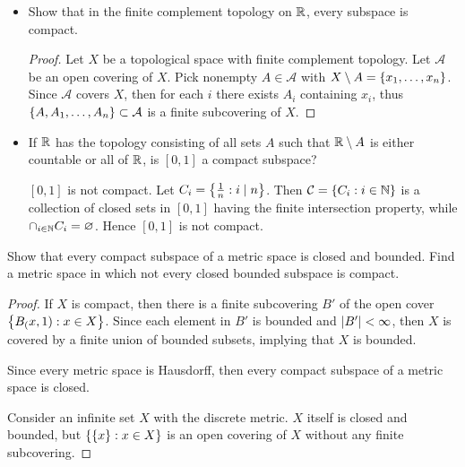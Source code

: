\documentclass[12pt,a4paper]{article}
\begin{document}
    \begin{ex}\hfill

        \begin{itemize}
            \item Show that in the finite complement topology on $\mathbb{R}$, every subspace is compact.
            \begin{proof}
                Let $X$ be a topological space with finite complement topology. Let $\mathcal{A}$ be an open covering of $X$. Pick nonempty $A\in\mathcal{A}$ with $X\setminus A=\left\{x_1,\dots,x_n\right\}$. Since $\mathcal{A}$ covers $X$, then for each $i$ there exists $A_i$ containing $x_i$, thus $\left\{A,A_1,\dots,A_n\right\}\subset\mathcal{A}$ is a finite subcovering of $X$.
            \end{proof}
            \item If $\mathbb{R}$ has the topology consisting of all sets $A$ such that $\mathbb{R}\setminus A$ is either countable or all of $\mathbb{R}$, is $[0,1]$ a compact subspace?
            \begin{sol}
                $[0,1]$ is not compact. Let $C_i=\left\{\frac{1}{n}:i\mid n\right\}$. Then $\mathcal{C}=\left\{C_i:i\in\mathbb{N}\right\}$ is a collection of closed sets in $[0,1]$ having the finite intersection property, while $\cap_{i\in\mathbb{N}} C_i=\varnothing$. Hence $[0,1]$ is not compact.
            \end{sol}
        \end{itemize}
    \end{ex}
    \hfill

    \begin{ex}
        Show that every compact subspace of a metric space is closed and bounded. Find a metric space in which not every closed bounded subspace is compact.
    \end{ex}
    \begin{proof}
        If $X$ is compact, then there is a finite subcovering $B'$ of the open cover $\left\{B_(x,1):x\in X\right\}$.  Since each element in $B'$ is bounded and $\left\lvert B'\right\rvert<\infty$, then $X$ is covered by a finite union of bounded subsets, implying that $X$ is bounded.

        Since every metric space is Hausdorff, then every compact subspace of a metric space is closed.

        Consider an infinite set $X$ with the discrete metric. $X$ itself is closed and bounded, but $\left\{\left\{x\right\}:x\in X\right\}$ is an open covering of $X$ without any finite subcovering.
    \end{proof}
    \hfill
    
\end{document}
